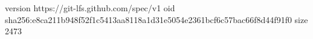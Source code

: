 version https://git-lfs.github.com/spec/v1
oid sha256:e8ca211b948f52f1c5413aa8118a1d31e5054e2361bcf6c57bac66f8d44f91f0
size 2473
